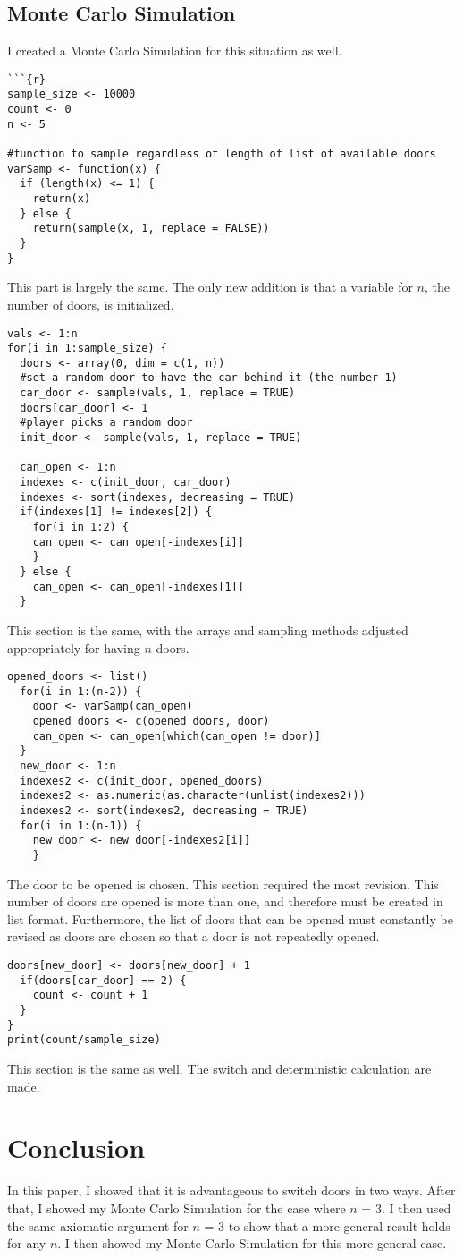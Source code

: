 \documentclass{article}
\begin{document}
\subsection{Monte Carlo Simulation}
I created a Monte Carlo Simulation for this situation as well.
\begin{lstlisting}
```{r}
sample_size <- 10000
count <- 0
n <- 5

#function to sample regardless of length of list of available doors
varSamp <- function(x) {
  if (length(x) <= 1) {
    return(x)
  } else {
    return(sample(x, 1, replace = FALSE))
  }
}
\end{lstlisting}
This part is largely the same. The only new addition is that a variable for $n$, the number of doors, is initialized. 
\newpage
\begin{lstlisting}
vals <- 1:n
for(i in 1:sample_size) {
  doors <- array(0, dim = c(1, n))
  #set a random door to have the car behind it (the number 1)
  car_door <- sample(vals, 1, replace = TRUE)
  doors[car_door] <- 1
  #player picks a random door
  init_door <- sample(vals, 1, replace = TRUE)
  
  can_open <- 1:n
  indexes <- c(init_door, car_door)
  indexes <- sort(indexes, decreasing = TRUE)
  if(indexes[1] != indexes[2]) {
    for(i in 1:2) {
    can_open <- can_open[-indexes[i]]
    }
  } else {
    can_open <- can_open[-indexes[1]]
  }
\end{lstlisting}
This section is the same, with the arrays and sampling methods adjusted appropriately for having $n$ doors.
\begin{lstlisting}
opened_doors <- list()
  for(i in 1:(n-2)) {
    door <- varSamp(can_open)
    opened_doors <- c(opened_doors, door)
    can_open <- can_open[which(can_open != door)] 
  }
  new_door <- 1:n
  indexes2 <- c(init_door, opened_doors)
  indexes2 <- as.numeric(as.character(unlist(indexes2)))
  indexes2 <- sort(indexes2, decreasing = TRUE)
  for(i in 1:(n-1)) {
    new_door <- new_door[-indexes2[i]]
    }
\end{lstlisting}
The door to be opened is chosen. This section required the most revision. This number of doors are opened is more than one, and therefore must be created in list format. Furthermore, the list of doors that can be opened must constantly be revised as doors are chosen so that a door is not repeatedly opened. 
\begin{lstlisting}
doors[new_door] <- doors[new_door] + 1
  if(doors[car_door] == 2) {
    count <- count + 1
  }
}
print(count/sample_size)
\end{lstlisting}
This section is the same as well. The switch and deterministic calculation are made. 

\newpage
\section{Conclusion}
In this paper, I showed that it is advantageous to switch doors in two ways. After that, I showed my Monte Carlo Simulation for the case where $n$ = 3. I then used the same axiomatic argument for $n$ = 3 to show that a more general result holds for any $n$. I then showed my Monte Carlo Simulation for this more general case. 
\end{document}
